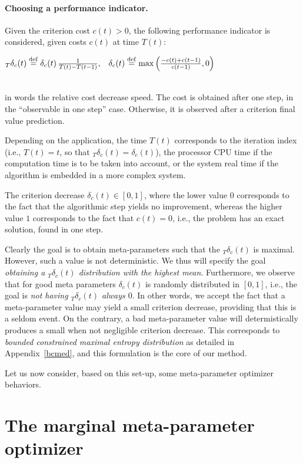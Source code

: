 \documentclass{article}
\newcommand{\deq}{\stackrel {\rm def}{=}}
\newcommand{\eqline}[1]{\\\centerline{$#1$}\\}
\begin{document}
\paragraph{Choosing a performance indicator.}

Given the criterion cost $c(t) > 0$, the following performance indicator is considered, given costs $c(t)$ at time $T(t)$:
\eqline{{}_T\delta_c(t) \deq \delta_c(t) \, \frac{1}{T(t) - T(t-1)}, \;\;\; \delta_c(t) \deq \max\left(\frac{-c(t) + c(t-1)}{c(t-1)}, 0\right)}
in words the relative cost decrease speed. The cost is obtained after one step, in the ``observable in one step'' case. Otherwise, it is observed after a criterion final value prediction.

Depending on the application, the time $T(t)$ corresponds to the iteration index (i.e., $T(t) = t$, so that ${}_T\delta_c(t) = \delta_c(t)$), the processor CPU time if the computation time is to be taken into account, or the system real time if the algorithm is embedded in a more complex system.

The criterion decrease $\delta_c(t) \in [0, 1]$, where the lower value $0$ corresponds to the fact that the algorithmic step yields no improvement, whereas the higher value $1$ corresponds to the fact that $c(t) = 0$, i.e., the problem has an exact solution, found in one step.

Clearly the goal is to obtain meta-parameters such that the ${}_T\delta_c(t)$ is maximal. However, such a value is not deterministic. We thus will specify the goal {\em obtaining a ${}_T\delta_c(t)$ distribution with the highest mean}. Furthermore, we observe \cite{} that for good meta parameters $\delta_c(t)$ is randomly distributed in $[0, 1]$, i.e., the goal is {\em not having ${}_T\delta_c(t)$ always $0$}. In other words, we accept the fact that a meta-parameter value may yield a small criterion decrease, providing that this is a seldom event. On the contrary, a bad meta-parameter value will determistically produces a small when not negligible criterion decrease. This corresponds to {\em bounded constrained maximal entropy distribution} as detailed in Appendix~\ref{bcmed}, and this formulation is the core of our method. 

Let us now consider, based on this set-up, some meta-parameter optimizer behaviors.

\section{The marginal meta-parameter optimizer}
\end{document}
